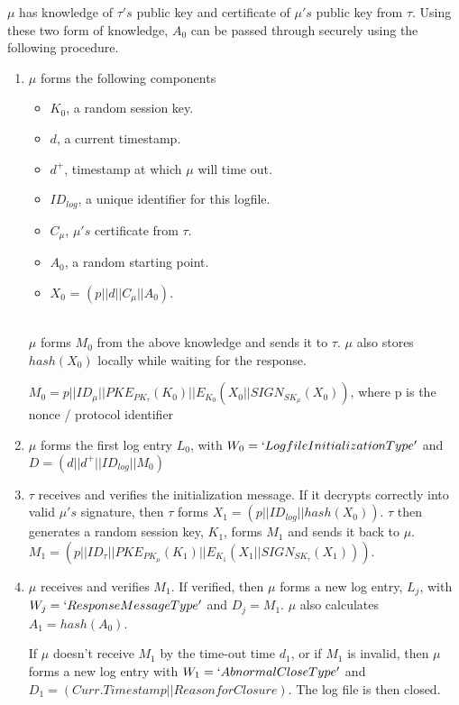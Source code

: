 \documentclass[12pt, letter]{article}
\begin{document}
$\mu$ has knowledge of $\tau's$ public key and certificate of $\mu's$ public key from $\tau$. Using these two form of knowledge, $A_0$ can be passed through securely using the following procedure.

\begin{enumerate}
    \item $\mu$ forms the following components
        \begin{itemize}
            \item $K_0$, a random session key. 
            \item $d$, a current timestamp. 
            \item $d^+$, timestamp at which $\mu$ will time out. 
            \item $ID_{log}$, a unique identifier for this logfile. 
            \item $C_{\mu}$, $\mu's$ certificate from $\tau$. 
            \item $A_0$, a random starting point. 
            \item $X_0$ = $(p || d || C_{\mu} || A_0)$. 
        \end{itemize}\\
        $\mu$ forms $M_0$ from the above knowledge and sends it to $\tau$. $\mu$ also stores $hash(X_0)$ locally while waiting for the response.
        
        $M_0 = p||ID_{\mu}||PKE_{PK_{\tau}}(K_0)||E_{K_0}(X_0||SIGN_{SK_{\mu}}(X_0))$, where p is the nonce / protocol identifier
        
        
    \item $\mu$ forms the first log entry $L_0$, with $W_0 = `LogfileInitializationType'$ and $D = (d||d^+||ID_{log}||M_0)$
    
    \item $\tau$ receives and verifies the initialization message. If it decrypts correctly into valid $\mu's$ signature, then $\tau$ forms 
    $X_1 = (p||ID_{log}||hash(X_0))$. $\tau$ then generates a random session key, $K_1$, forms $M_1$ and sends it back to $\mu$. $M_1 = (p||ID_{\tau}||PKE_{PK_{\mu}}(K_1)|| E_{K_1}(X_1||SIGN_{SK_\tau}(X_1)))$.
    
    \item $\mu$ receives and verifies $M_1$. If verified, then $\mu$ forms a new log entry, $L_j$, with $W_j=`ResponseMessageType'$ and $D_j = M_1$. $\mu$ also calculates $A_1 = hash(A_0)$.
    
    If $\mu$ doesn’t receive $M_1$ by the time-out time $d_1$, or if $M_1$ is invalid, then $\mu$ forms a new log entry with $W_1 = `AbnormalCloseType'$ and $D_1 = (Curr. Timestamp || Reason for Closure)$. The log file is then closed. 
\end{enumerate}
\end{document}

